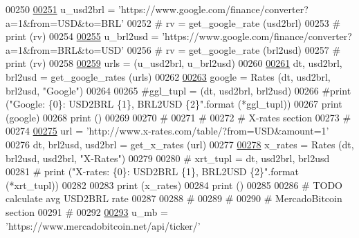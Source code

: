 \begin{DoxyCode}
00250     
\hyperlink{namespaceraw__urlparser_a63e1f0abe7b1f43c4891ce9aec98261d}{00251} u\_usd2brl = \textcolor{stringliteral}{'https://www.google.com/finance/converter?a=1&from=USD&to=BRL'}
00252 \textcolor{comment}{# rv = get\_google\_rate (usd2brl)}
00253 \textcolor{comment}{# print (rv)}
00254 
\hyperlink{namespaceraw__urlparser_a876711ddd7ebb3991a35cc1768d1d22c}{00255} u\_brl2usd = \textcolor{stringliteral}{'https://www.google.com/finance/converter?a=1&from=BRL&to=USD'}
00256 \textcolor{comment}{# rv = get\_google\_rate (brl2usd)}
00257 \textcolor{comment}{# print (rv)}
00258 
\hyperlink{namespaceraw__urlparser_aded92a1146e1ce1f14fd79a361f947f9}{00259} urls = (u\_usd2brl, u\_brl2usd)
00260 
\hyperlink{namespaceraw__urlparser_adb724d2d0b7c561e8b0c53a42831efce}{00261} dt, usd2brl, brl2usd = get\_google\_rates (urls)
00262 
\hyperlink{namespaceraw__urlparser_a1b812abf4fbbd8478dca91446c66b646}{00263} google = Rates (dt, usd2brl, brl2usd, \textcolor{stringliteral}{"Google"})
00264 
00265 \textcolor{comment}{#ggl\_tupl = (dt, usd2brl, brl2usd)}
00266 \textcolor{comment}{#print ("Google: \{0\}: USD2BRL \{1\}, BRL2USD \{2\}".format (*ggl\_tupl))}
00267 \textcolor{keywordflow}{print} (google)
00268 \textcolor{keywordflow}{print} ()
00269 
00270 \textcolor{comment}{#}
00271 \textcolor{comment}{#}
00272 \textcolor{comment}{# X-rates section }
00273 \textcolor{comment}{# }
00274 
\hyperlink{namespaceraw__urlparser_a9242b893f4f49ef7cc0d4e599b70daa4}{00275} url = \textcolor{stringliteral}{'http://www.x-rates.com/table/?from=USD&amount=1'}
00276 dt, brl2usd, usd2brl = get\_x\_rates (url)
00277 
\hyperlink{namespaceraw__urlparser_a76bac0500149c0b7dc5e8dfef56f05c3}{00278} x\_rates = Rates (dt, brl2usd, usd2brl, \textcolor{stringliteral}{"X-Rates"})
00279 
00280 \textcolor{comment}{# xrt\_tupl = dt, usd2brl, brl2usd}
00281 \textcolor{comment}{# print ("X-rates: \{0\}: USD2BRL \{1\}, BRL2USD \{2\}".format (*xrt\_tupl))}
00282 
00283 \textcolor{keywordflow}{print} (x\_rates)
00284 \textcolor{keywordflow}{print} ()
00285 
00286 \textcolor{comment}{# TODO calculate avg USD2BRL rate}
00287 
00288 \textcolor{comment}{#}
00289 \textcolor{comment}{#}
00290 \textcolor{comment}{# MercadoBitcoin section }
00291 \textcolor{comment}{# }
00292 
\hyperlink{namespaceraw__urlparser_a9a840f174b92a24c415b88c87e84b73d}{00293} u\_mb = \textcolor{stringliteral}{'https://www.mercadobitcoin.net/api/ticker/'}

\end{DoxyCode}
